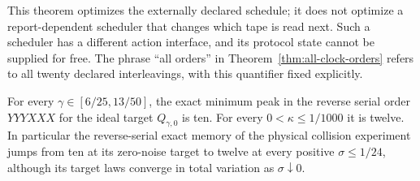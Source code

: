 This theorem optimizes the externally declared schedule; it does not
optimize a report-dependent scheduler that changes which tape is read
next. Such a scheduler has a different action interface, and its
protocol state cannot be supplied for free. The phrase ``all orders''
in Theorem~\ref{thm:all-clock-orders} refers to all twenty declared
interleavings, with this quantifier fixed explicitly.

\begin{theorem}
\label{thm:reverse-jump}
For every $\gamma\in[6/25,13/50]$, the exact minimum peak in the
reverse serial order $YYYXXX$ for the ideal target $Q_{\gamma,0}$ is
ten. For every $0<\kappa\le1/1000$ it is twelve. In particular the
reverse-serial exact memory of the physical collision experiment jumps
from ten at its zero-noise target to twelve at every positive
$\sigma\le1/24$, although its target laws converge in total variation
as $\sigma\downarrow0$.
\end{theorem}
